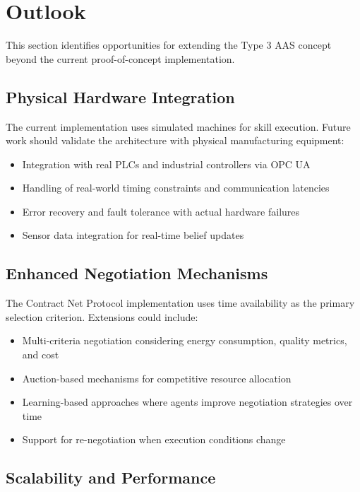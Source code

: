 \chapter{Outlook}
\label{ch:outlook}

This section identifies opportunities for extending the Type 3 \ac{AAS} concept beyond the current proof-of-concept implementation.

\section{Physical Hardware Integration}

The current implementation uses simulated machines for skill execution. Future work should validate the architecture with physical manufacturing equipment:

\begin{itemize}
    \item Integration with real PLCs and industrial controllers via OPC UA
    \item Handling of real-world timing constraints and communication latencies
    \item Error recovery and fault tolerance with actual hardware failures
    \item Sensor data integration for real-time belief updates
\end{itemize}

\section{Enhanced Negotiation Mechanisms}

The Contract Net Protocol implementation uses time availability as the primary selection criterion. Extensions could include:

\begin{itemize}
    \item Multi-criteria negotiation considering energy consumption, quality metrics, and cost
    \item Auction-based mechanisms for competitive resource allocation
    \item Learning-based approaches where agents improve negotiation strategies over time
    \item Support for re-negotiation when execution conditions change
\end{itemize}

\section{Scalability and Performance}


